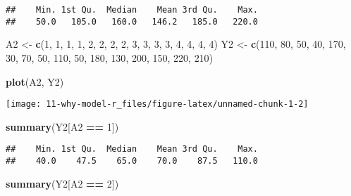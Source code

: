 \documentclass[10pt,]{book}
\newenvironment{Shaded}{\begin{snugshade}}{\end{snugshade}}
\newcommand{\DecValTok}[1]{\textcolor[rgb]{0.00,0.00,0.81}{#1}}
\newcommand{\KeywordTok}[1]{\textcolor[rgb]{0.13,0.29,0.53}{\textbf{#1}}}
\newcommand{\NormalTok}[1]{#1}
\newcommand{\OperatorTok}[1]{\textcolor[rgb]{0.81,0.36,0.00}{\textbf{#1}}}
\newcommand{\StringTok}[1]{\textcolor[rgb]{0.31,0.60,0.02}{#1}}
\begin{document}
\begin{verbatim}
##    Min. 1st Qu.  Median    Mean 3rd Qu.    Max. 
##    50.0   105.0   160.0   146.2   185.0   220.0
\end{verbatim}

\begin{Shaded}
\begin{Highlighting}[]
\NormalTok{A2 <-}\StringTok{ }\KeywordTok{c}\NormalTok{(}\DecValTok{1}\NormalTok{, }\DecValTok{1}\NormalTok{, }\DecValTok{1}\NormalTok{, }\DecValTok{1}\NormalTok{, }\DecValTok{2}\NormalTok{, }\DecValTok{2}\NormalTok{, }\DecValTok{2}\NormalTok{, }\DecValTok{2}\NormalTok{, }\DecValTok{3}\NormalTok{, }\DecValTok{3}\NormalTok{, }\DecValTok{3}\NormalTok{, }\DecValTok{3}\NormalTok{, }\DecValTok{4}\NormalTok{, }\DecValTok{4}\NormalTok{, }\DecValTok{4}\NormalTok{, }\DecValTok{4}\NormalTok{)}
\NormalTok{Y2 <-}\StringTok{ }\KeywordTok{c}\NormalTok{(}\DecValTok{110}\NormalTok{, }\DecValTok{80}\NormalTok{, }\DecValTok{50}\NormalTok{, }\DecValTok{40}\NormalTok{, }\DecValTok{170}\NormalTok{, }\DecValTok{30}\NormalTok{, }\DecValTok{70}\NormalTok{, }\DecValTok{50}\NormalTok{, }\DecValTok{110}\NormalTok{, }\DecValTok{50}\NormalTok{, }\DecValTok{180}\NormalTok{,}
        \DecValTok{130}\NormalTok{, }\DecValTok{200}\NormalTok{, }\DecValTok{150}\NormalTok{, }\DecValTok{220}\NormalTok{, }\DecValTok{210}\NormalTok{)}

\KeywordTok{plot}\NormalTok{(A2, Y2)}
\end{Highlighting}
\end{Shaded}

\begin{center}\texttt{[image: 11-why-model-r\_files/figure-latex/unnamed-chunk-1-2]} \end{center}

\begin{Shaded}
\begin{Highlighting}[]
\KeywordTok{summary}\NormalTok{(Y2[A2 }\OperatorTok{==}\StringTok{ }\DecValTok{1}\NormalTok{])}
\end{Highlighting}
\end{Shaded}

\begin{verbatim}
##    Min. 1st Qu.  Median    Mean 3rd Qu.    Max. 
##    40.0    47.5    65.0    70.0    87.5   110.0
\end{verbatim}

\begin{Shaded}
\begin{Highlighting}[]
\KeywordTok{summary}\NormalTok{(Y2[A2 }\OperatorTok{==}\StringTok{ }\DecValTok{2}\NormalTok{])}
\end{Highlighting}
\end{Shaded}
\end{document}
